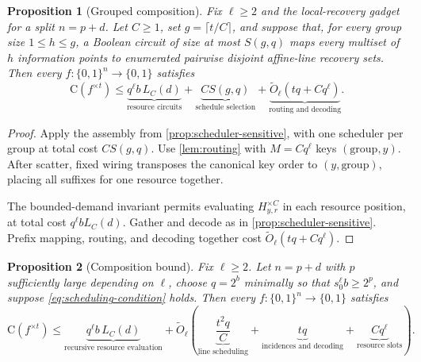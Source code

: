 \documentclass[11pt]{article}
\newtheorem{proposition}[proposition]{Proposition}
\newcommand{\bits}{\{0,1\}}
\newcommand{\C}{\mathrm{C}}
\begin{document}
\begin{proposition}[Grouped composition]
\label{prop:grouped-composition}
Fix $\ell\ge2$ and the local-recovery gadget for a split $n=p+d$.  Let
$C\ge1$, set $g=\lceil t/C\rceil$, and suppose that, for every group size
$1\le h\le g$, a Boolean circuit of size at most $S(g,q)$ maps every multiset
of $h$ information points to enumerated pairwise disjoint affine-line recovery
sets.  Then
every $f:\bits^n\to\bits$ satisfies
\begin{equation}\label{eq:grouped-composition}
\C(f^{\times t})
\le \underbrace{q^\ell b\,L_C(d)}_{\text{resource circuits}}
   +\underbrace{C S(g,q)}_{\text{schedule selection}}
   +\underbrace{\widetilde O_\ell\!\left(tq+Cq^\ell\right)}_{
     \text{routing and decoding}}.
\end{equation}
\end{proposition}

\begin{proof}
Apply the assembly from \cref{prop:scheduler-sensitive}, with one scheduler
per group at total cost $CS(g,q)$.
Use \cref{lem:routing} with $M=Cq^\ell$ keys $(\text{group},y)$.
After scatter, fixed wiring transposes the canonical key order to
$(y,\text{group})$, placing all suffixes for one resource together.

The bounded-demand invariant permits evaluating $H_{y,r}^{\times C}$ in
each resource position, at total cost $q^\ell bL_C(d)$.  Gather and decode
as in \cref{prop:scheduler-sensitive}.  Prefix mapping, routing, and decoding
together cost $\widetilde O_\ell(tq+Cq^\ell)$.
\end{proof}

\begin{samepage}
\begin{proposition}[Composition bound]\label{prop:master}
Fix $\ell\ge2$.  Let $n=p+d$ with $p$ sufficiently large depending on
$\ell$, choose $q=2^b$ minimally so that $s_0^\ell b\ge2^p$, and suppose
\cref{eq:scheduling-condition} holds.  Then every
$f:\bits^n\to\bits$ satisfies
\begin{equation}\label{eq:master}
\C(f^{\times t})
\le
\underbrace{q^\ell b\,L_C(d)}_{\text{recursive resource evaluation}}
+\widetilde O_\ell\!\left(
  \underbrace{\frac{t^2q}{C}}_{\text{line scheduling}}
  +\underbrace{tq}_{\text{incidences and decoding}}
  +\underbrace{Cq^\ell}_{\text{resource slots}}
\right).
\end{equation}
\end{proposition}
\end{samepage}
\end{document}
